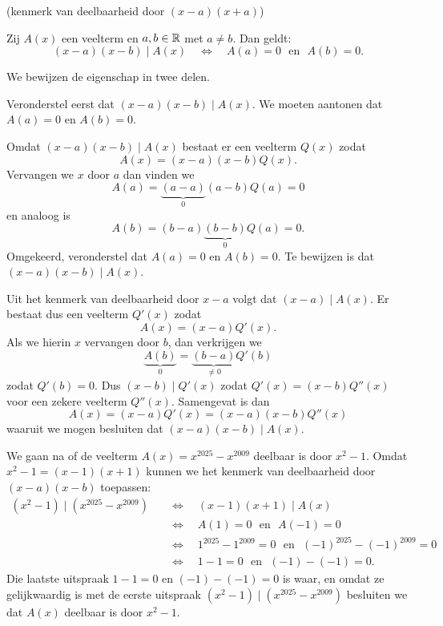 \documentclass{ximera}
\begin{document}
\begin{theorem}(kenmerk van deelbaarheid door \((x-a)(x+a)\))

Zij \(A(x)\) een veelterm en \(a,b \in \mathbb{R}\) met \(a \neq b\). Dan geldt:
\[
(x-a)(x-b) \mid A(x) \quad \Leftrightarrow \quad A(a) = 0 \,\, \text{ en } \,\, A(b) = 0.
\]

\end{theorem} 


We bewijzen de eigenschap in twee delen.

Veronderstel eerst dat \((x-a)(x-b) \mid A(x)\). We moeten aantonen dat \(A(a) = 0\) en \(A(b) = 0\).

Omdat \((x-a)(x-b) \mid A(x)\) bestaat er een veelterm \(Q(x)\) zodat
\[
A(x) = (x-a)(x-b)Q(x).
\]
Vervangen we \(x\) door \(a\) dan vinden we 
\[
A(a) = \underbrace{(a-a)}_{0}(a-b)Q(a) = 0
\]
en analoog is
\[
A(b) = (b-a)\underbrace{(b-b)}_{0}Q(a) = 0.
\]
Omgekeerd, veronderstel dat \(A(a) = 0\) en \(A(b) = 0\). Te bewijzen is dat \((x-a)(x-b) \mid A(x)\).

Uit het kenmerk van deelbaarheid door \(x-a\) volgt dat \((x-a) \mid A(x)\). Er bestaat dus een veelterm \(Q'(x)\) zodat
\[
A(x) = (x-a)Q'(x).
\]
Als we hierin \(x\) vervangen door \(b\), dan verkrijgen we 
\[
\underbrace{A(b)}_{0} = \underbrace{(b - a)}_{\neq 0} Q'(b)
\]
zodat \(Q'(b) = 0\). Dus \((x-b) \mid Q'(x)\) zodat \(Q'(x) = (x-b)Q''(x)\) voor een zekere veelterm \(Q''(x)\). Samengevat is dan
\[
A(x) = (x-a)Q'(x) = (x-a)(x-b)Q''(x)
\]
waaruit we mogen besluiten dat \((x-a)(x-b) \mid A(x)\).



\begin{example} 
We gaan na of de veelterm \(A(x) = x^{2025} - x^{2009}\) deelbaar is door \(x^2 - 1\). Omdat \(x^2-1 = (x-1)(x+1)\) kunnen we het kenmerk van deelbaarheid door \((x-a)(x-b)\) toepassen:
\begin{align*}
(x^2-1) \mid (x^{2025} - x^{2009}) \quad 
& \Leftrightarrow \quad (x-1)(x+1) \mid A(x) \\
& \Leftrightarrow \quad A(1) = 0 \,\, \text{ en } \,\, A(-1) = 0 \\
& \Leftrightarrow \quad 1^{2025} - 1^{2009} = 0 \,\, \text{ en } \,\, (-1)^{2025} - (-1)^{2009} = 0 \\
& \Leftrightarrow \quad 1 - 1 = 0 \,\, \text{ en } \,\, (-1) - (-1) = 0.
\end{align*}
Die laatste uitspraak \(1 - 1 = 0\) en \((-1) - (-1) = 0\) is waar, en omdat ze gelijkwaardig is met de eerste uitspraak \((x^2-1) \mid (x^{2025} - x^{2009})\) besluiten we dat \(A(x)\) deelbaar is door \(x^2-1\). 
\end{example} 

	
\end{document}
